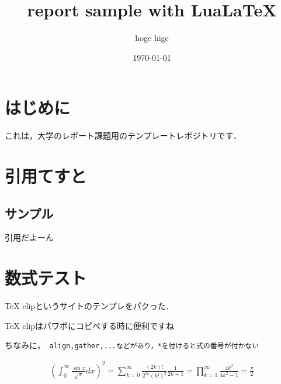 \documentclass[a4paper, 12pt]{ltjsarticle}
\begin{document}

\title{
  report sample with Lua{\LaTeX}
}
\author{
  hoge hige
}
\date{\today}
\maketitle %

\tableofcontents %
\newpage

\section{はじめに}
これは，大学のレポート課題用のテンプレートレポジトリです．


\section{引用てすと}
\subsection{サンプル}
引用\cite{hoge}だよーん


\section{数式テスト}
TeX clipというサイトのテンプレをパクった．

TeX clipはパワポにコピペする時に便利ですね

ちなみに，\verb | align,gather,...などがあり，*を付けると式の番号が付かない |

\begin{gather}
  \left( \int_0^\infty \frac{\sin x}{\sqrt{x}} dx \right)^2 =
  \sum_{k=0}^\infty \frac{(2k)!}{2^{2k}(k!)^2} \frac{1}{2k+1} =
  \prod_{k=1}^\infty \frac{4k^2}{4k^2 - 1} = \frac{\pi}{2}
\end{gather}
\end{document}
